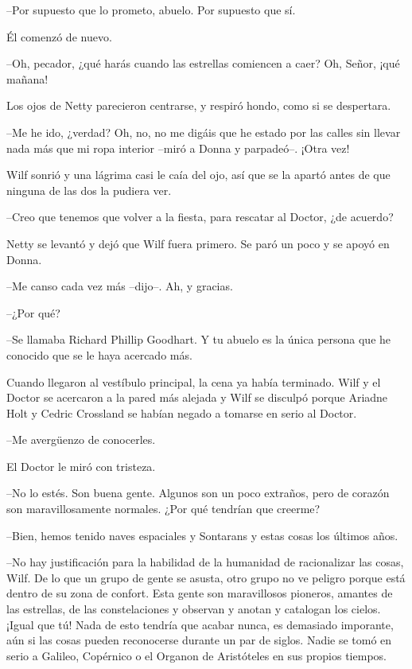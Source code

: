 --Por supuesto que lo prometo, abuelo. Por supuesto que sí.

Él comenzó de nuevo.

--Oh, pecador, ¿qué harás cuando las estrellas comiencen a caer? Oh,
Señor, ¡qué mañana!

Los ojos de Netty parecieron centrarse, y respiró hondo, como si se
despertara.

--Me he ido, ¿verdad? Oh, no, no me digáis que he estado por las calles
sin llevar nada más que mi ropa interior --miró a Donna y parpadeó--.
¡Otra vez!

Wilf sonrió y una lágrima casi le caía del ojo, así que se la apartó
antes de que ninguna de las dos la pudiera ver.

--Creo que tenemos que volver a la fiesta, para rescatar al Doctor, ¿de
acuerdo?

Netty se levantó y dejó que Wilf fuera primero. Se paró un poco y se
apoyó en Donna.

--Me canso cada vez más --dijo--. Ah, y gracias.

--¿Por qué?

--Se llamaba Richard Phillip Goodhart. Y tu abuelo es la única persona
que he conocido que se le haya acercado más.

Cuando llegaron al vestíbulo principal, la cena ya había terminado. Wilf
y el Doctor se acercaron a la pared más alejada y Wilf se disculpó
porque Ariadne Holt y Cedric Crossland se habían negado a tomarse en
serio al Doctor.

--Me avergüenzo de conocerles.

El Doctor le miró con tristeza.

--No lo estés. Son buena gente. Algunos son un poco extraños, pero de
corazón son maravillosamente normales. ¿Por qué tendrían que creerme?

--Bien, hemos tenido naves espaciales y Sontarans y estas cosas los
últimos años.

--No hay justificación para la habilidad de la humanidad de racionalizar
las cosas, Wilf. De lo que un grupo de gente se asusta, otro grupo no ve
peligro porque está dentro de su zona de confort. Esta gente son
maravillosos pioneros, amantes de las estrellas, de las constelaciones y
observan y anotan y catalogan los cielos. ¡Igual que tú! Nada de esto
tendría que acabar nunca, es demasiado imporante, aún si las cosas
pueden reconocerse durante un par de siglos. Nadie se tomó en serio a
Galileo, Copérnico o el Organon de Aristóteles en sus propios tiempos.

